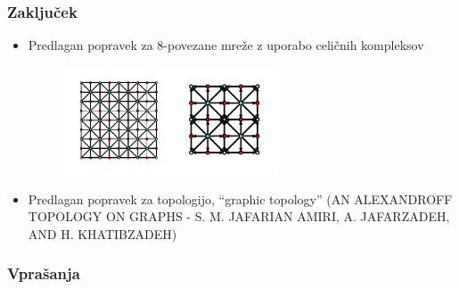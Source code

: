 \documentclass{beamer}
\begin{document}
\begin{frame}
    \frametitle{Zaključek}
    \begin{itemize}
        \item Predlagan popravek za 8-povezane mreže z uporabo celičnih kompleksov
        \begin{figure}
            \begin{center}
            \includegraphics[width=0.6\textwidth]{r2-cell-graph.pdf}
            \end{center}
        \end{figure}
        \item Predlagan popravek za topologijo, ``graphic topology'' (AN ALEXANDROFF TOPOLOGY ON GRAPHS - S. M. JAFARIAN AMIRI, A. JAFARZADEH, AND H. KHATIBZADEH)
    \end{itemize}
\end{frame}
\begin{frame}
    \frametitle{Vprašanja}
\end{frame}
\end{document}
